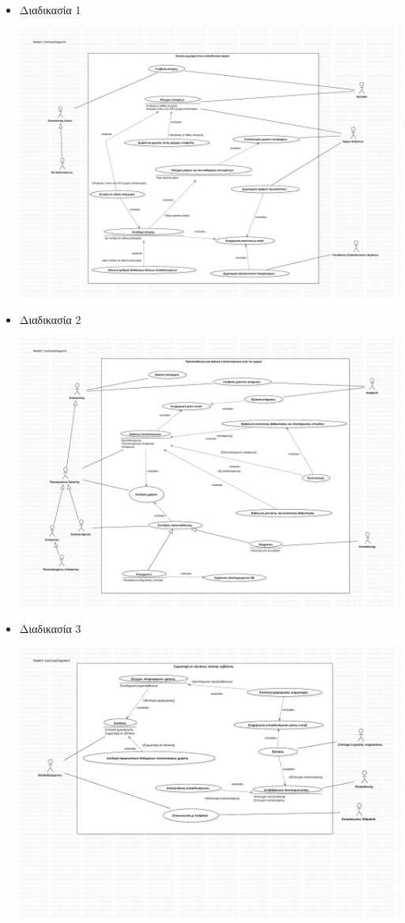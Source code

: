 \documentclass[a4paper, titlepage, twoside]{article}
\begin{document}
\begin{itemize}
\item Διαδικασία 1
\label{sec:orgd18cec9}
\begin{center}
\includegraphics[width=.9\linewidth]{use-case_1.pdf}
\end{center}
\item Διαδικασία 2
\label{sec:org7ca5e81}
\begin{center}
\includegraphics[width=.9\linewidth]{use-case_2.pdf}
\end{center}
\item Διαδικασία 3
\label{sec:org75c7d73}
\begin{center}
\includegraphics[width=.9\linewidth]{use-case_3.pdf}

\end{center}
\end{itemize}
\end{document}
